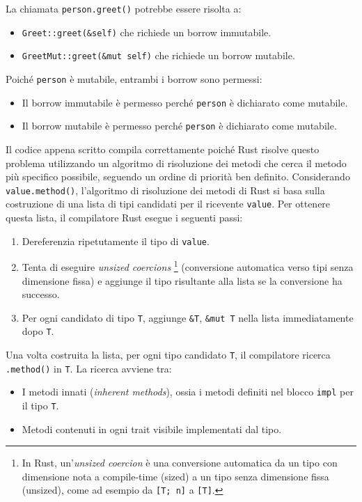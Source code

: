 La chiamata \texttt{person.greet()} potrebbe essere risolta a:
\begin{itemize}
    \item \texttt{Greet::greet(\&self)} che richiede un borrow immutabile.
    \item \texttt{GreetMut::greet(\&mut self)} che richiede un borrow mutabile.
\end{itemize}
Poiché \texttt{person} è mutabile, entrambi i borrow sono permessi:
\begin{itemize}
    \item Il borrow immutabile è permesso perché \texttt{person} è dichiarato come mutabile.
    \item Il borrow mutabile è permesso perché \texttt{person} è dichiarato come mutabile.
\end{itemize}
Il codice appena scritto compila correttamente poiché Rust risolve questo problema utilizzando un algoritmo di risoluzione dei metodi che cerca il metodo più specifico possibile, seguendo un ordine di priorità ben definito. Considerando \texttt{value.method()}, l'algoritmo di risoluzione dei metodi di Rust si basa sulla costruzione di una lista di tipi candidati per il ricevente \texttt{value}. Per ottenere questa lista, il compilatore Rust esegue i seguenti passi:
\begin{enumerate}
    \item Dereferenzia ripetutamente il tipo di \texttt{value}. 
    \item Tenta di eseguire \textit{unsized coercions} \footnote{In Rust, un'\textit{unsized coercion} è una conversione automatica da un tipo con dimensione nota a compile-time (sized) a un tipo senza dimensione fissa (unsized), come ad esempio da \texttt{[T; n]} a \texttt{[T]}.} (conversione automatica verso tipi senza dimensione fissa)  e aggiunge il tipo risultante alla lista se la conversione ha successo.
    \item Per ogni candidato di tipo \texttt{T}, aggiunge \texttt{\&T}, \texttt{\&mut T} nella lista immediatamente dopo \texttt{T}.
\end{enumerate}
Una volta costruita la lista, per ogni tipo candidato \texttt{T}, il compilatore ricerca \texttt{.method()} in \texttt{T}. La ricerca avviene tra:
\begin{itemize}
    \item I metodi innati (\textit{inherent methods}), ossia i metodi definiti nel blocco \texttt{impl} per il tipo \texttt{T}.
    \item Metodi contenuti in ogni trait visibile implementati dal tipo.
\end{itemize}
